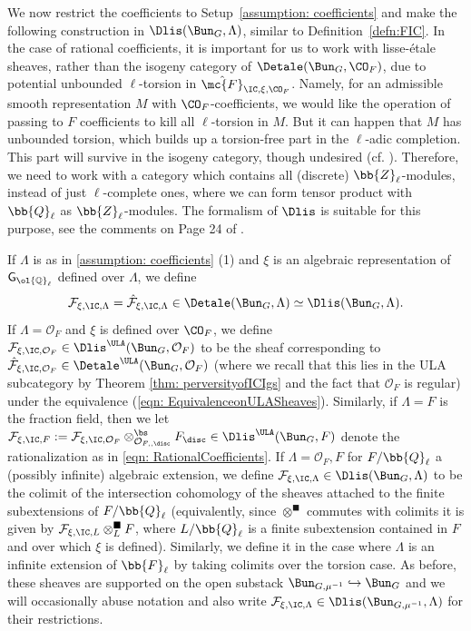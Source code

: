 \documentclass[letterpaper,11pt]{amsart}
\begin{document}
We now restrict the coefficients to Setup~\ref{assumption: coefficients} and make the following construction in $\Dlis(\Bun_G,\Lambda)$, similar to Definition~\ref{defn:FIC}. In the case of rational coefficients, it is important for us to work with lisse-\'etale sheaves, rather than the isogeny category of $\Detale(\Bun_G,\CO_F)$, due to potential unbounded $\ell$-torsion in $\hat{\mc{F}}_{\IC, \xi, \CO_F}$. Namely, for an admissible smooth representation $M$ with $\CO_F$-coefficients, we would like the operation of passing to $F$ coefficients to kill all $\ell$-torsion in $M$. But it can happen that $M$ has unbounded torsion, which builds up a torsion-free part in the $\ell$-adic completion. This part will survive in the isogeny category, though undesired (cf. \cite[Remark~4.10]{BhattHanSixFunctors}). Therefore, we need to work with a category which contains all (discrete) $\bb{Z}_\ell$-modules, instead of just $\ell$-complete ones, where we can form tensor product with $\bb{Q}_\ell$ as $\bb{Z}_\ell$-modules. The formalism of $\Dlis$ is suitable for this purpose, see the comments on Page 24 of \cite{FSGeomLLC}.

\begin{construction}{\label{cons: ConstructionofSheaveswithQellCoefficients}}
If $\Lambda$ is as in \ref{assumption: coefficients} (1) and $\xi$ is an algebraic representation of $\mathsf{G}_{\ol{\mathbb{Q}}_{\ell}}$ defined over $\Lambda$, we define 
\[\mathcal{F}_{\xi,\IC,\Lambda} = \hat{\mathcal{F}}_{\xi,\IC,\Lambda} \in \Detale(\Bun_{G},\Lambda) \simeq \Dlis(\Bun_{G},\Lambda).\] 
If $\Lambda = \mathcal{O}_{F}$ and $\xi$ is defined over $\CO_F$, we define $\mathcal{F}_{\xi,\IC,\mathcal{O}_{F}} \in \Dlis^{\ULA}(\Bun_{G},\mathcal{O}_{F})$ to be the sheaf corresponding to
$\hat{\mathcal{F}}_{\xi,\IC,\mathcal{O}_{F}} \in \Detale^{\ULA}(\Bun_{G},\mathcal{O}_{F})$  (where we recall that this lies in the ULA subcategory by Theorem \ref{thm: perversityofICIgs} and the fact that $\mathcal{O}_{F}$ is regular) under the equivalence (\ref{eqn: EquivalenceonULASheaves}). Similarly, if $\Lambda = F$ is the fraction field, then we let $\mathcal{F}_{\xi,\IC,F} := \mathcal{F}_{\xi,\IC,\mathcal{O}_{F}} \otimes^{\bs}_{\mathcal{O}_{F,,\disc}} F_{\disc} \in \Dlis^{\ULA}(\Bun_{G},F)$ denote the rationalization as in \eqref{eqn: RationalCoefficients}. If $\Lambda = \mathcal{O}_{F},F$ for $F/\bb{Q}_{\ell}$ a (possibly infinite) algebraic extension, we define $\mathcal{F}_{\xi,\IC,\Lambda} \in \Dlis(\Bun_{G},\Lambda)$ to be the colimit of the intersection cohomology of the sheaves attached to the finite subextensions of $F/\bb{Q}_{\ell}$ (equivalently, since $\otimes^{\blacksquare}$ commutes with colimits it is given by $\mathcal{F}_{\xi,\IC,L} \otimes^{\blacksquare}_{L} F$, where $L/\bb{Q}_{\ell}$ is a finite subextension contained in $F$ and over which $\xi$ is defined). Similarly, we define it in the case where $\Lambda$ is an infinite extension of $\bb{F}_{\ell}$ by taking colimits over the torsion case. As before, these sheaves are supported on the open substack $\Bun_{G,\mu^{-1}} \hookrightarrow \Bun_{G}$ and we will occasionally abuse notation and also write $\mathcal{F}_{\xi,\IC,\Lambda} \in \Dlis(\Bun_{G,\mu^{-1}},\Lambda)$ for their restrictions. 
\end{construction}
\end{document}
